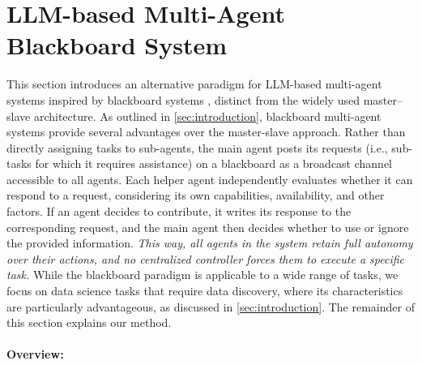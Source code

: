 \section{LLM-based Multi-Agent Blackboard System}
\label{sec:method}

This section introduces an alternative paradigm for LLM-based multi-agent systems inspired by blackboard systems \citep{10.1145/356810.356816}, distinct from the widely used master–slave architecture. As outlined in \textsection \ref{sec:introduction}, blackboard multi-agent systems provide several advantages over the master-slave approach. Rather than directly assigning tasks to sub-agents, the main agent posts its requests (i.e., sub-tasks for which it requires assistance) on a blackboard as a broadcast channel accessible to all agents. Each helper agent independently evaluates whether it can respond to a request, considering its own capabilities, availability, and other factors. If an agent decides to contribute, it writes its response to the corresponding request, and the main agent then decides whether to use or ignore the provided information. \textit{This way, all agents in the system retain full autonomy over their actions, and no centralized controller forces them to execute a specific task.} While the blackboard paradigm is applicable to a wide range of tasks, we focus on data science tasks that require data discovery, where its characteristics are particularly advantageous, as discussed in \textsection \ref{sec:introduction}. The remainder of this section explains our method.



\paragraph{Overview:} 

